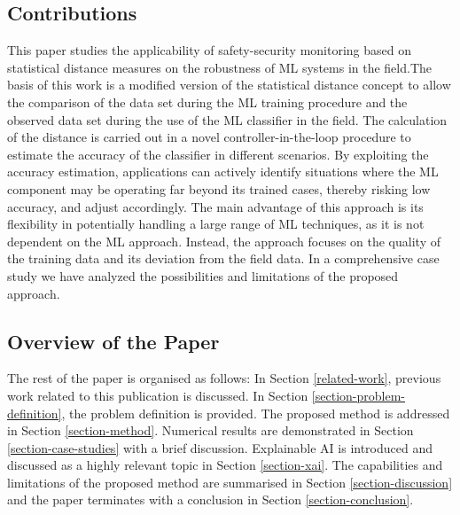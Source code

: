 \documentclass{article}
\begin{document}
\subsection{Contributions}
This paper studies the applicability of safety-security monitoring based on statistical distance measures on the robustness of ML systems in the field.The basis of this work is a modified version of the statistical distance concept to allow the comparison of the data set during the ML training procedure and the observed data set during the use of the ML classifier in the field. The calculation of the distance is carried out in a novel controller-in-the-loop procedure to estimate the accuracy of the classifier in different scenarios. By exploiting the accuracy estimation, applications can actively identify situations where the ML component may be operating far beyond its trained cases, thereby risking low accuracy, and adjust accordingly. The main advantage of this approach is its flexibility in potentially handling a large range of ML techniques, as it is not dependent on the ML approach. Instead, the approach focuses on the quality of the training data and its deviation from the field data. In a comprehensive case study we have analyzed the possibilities and limitations of the proposed approach.

\subsection{Overview of the Paper}
The rest of the paper is organised as follows: In Section \ref{related-work}, previous work related to this publication is discussed.  In Section \ref{section-problem-definition}, the problem definition is provided. The proposed method is addressed in Section \ref{section-method}. Numerical results are demonstrated in Section \ref{section-case-studies} with a brief discussion. Explainable AI is introduced and discussed as a highly relevant topic in Section \ref{section-xai}. The capabilities and limitations of the proposed method are summarised in Section \ref{section-discussion} and the paper terminates with a conclusion in Section \ref{section-conclusion}. 
\end{document}
